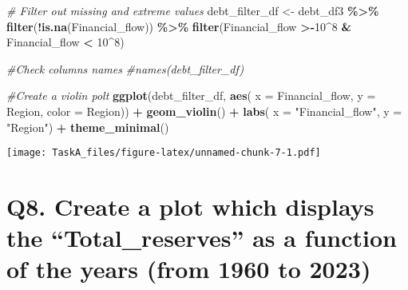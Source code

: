 \documentclass[
]{article}
\newenvironment{Shaded}{\begin{snugshade}}{\end{snugshade}}
\newcommand{\AttributeTok}[1]{\textcolor[rgb]{0.13,0.29,0.53}{#1}}
\newcommand{\CommentTok}[1]{\textcolor[rgb]{0.56,0.35,0.01}{\textit{#1}}}
\newcommand{\DecValTok}[1]{\textcolor[rgb]{0.00,0.00,0.81}{#1}}
\newcommand{\FunctionTok}[1]{\textcolor[rgb]{0.13,0.29,0.53}{\textbf{#1}}}
\newcommand{\NormalTok}[1]{#1}
\newcommand{\OtherTok}[1]{\textcolor[rgb]{0.56,0.35,0.01}{#1}}
\newcommand{\SpecialCharTok}[1]{\textcolor[rgb]{0.81,0.36,0.00}{\textbf{#1}}}
\newcommand{\StringTok}[1]{\textcolor[rgb]{0.31,0.60,0.02}{#1}}
\begin{document}
\begin{Shaded}
\begin{Highlighting}[]
\CommentTok{\# Filter out missing and extreme values}
\NormalTok{debt\_filter\_df }\OtherTok{\textless{}{-}}\NormalTok{ debt\_df3 }\SpecialCharTok{\%\textgreater{}\%}
  \FunctionTok{filter}\NormalTok{(}\SpecialCharTok{!}\FunctionTok{is.na}\NormalTok{(Financial\_flow)) }\SpecialCharTok{\%\textgreater{}\%}
  \FunctionTok{filter}\NormalTok{(Financial\_flow }\SpecialCharTok{\textgreater{}{-}}\DecValTok{10}\SpecialCharTok{\^{}}\DecValTok{8} \SpecialCharTok{\&}\NormalTok{ Financial\_flow }\SpecialCharTok{\textless{}} \DecValTok{10}\SpecialCharTok{\^{}}\DecValTok{8}\NormalTok{)}

\CommentTok{\#Check columns\textquotesingle{} names}
\CommentTok{\#names(debt\_filter\_df)}

\CommentTok{\#Create a violin polt}
\FunctionTok{ggplot}\NormalTok{(debt\_filter\_df, }\FunctionTok{aes}\NormalTok{( }\AttributeTok{x =}\NormalTok{ Financial\_flow, }\AttributeTok{y =}\NormalTok{ Region, }\AttributeTok{color =}\NormalTok{ Region)) }\SpecialCharTok{+}
  \FunctionTok{geom\_violin}\NormalTok{() }\SpecialCharTok{+}
  \FunctionTok{labs}\NormalTok{( }\AttributeTok{x =} \StringTok{"Financial\_flow"}\NormalTok{, }\AttributeTok{y =} \StringTok{"Region"}\NormalTok{) }\SpecialCharTok{+}
  \FunctionTok{theme\_minimal}\NormalTok{() }
\end{Highlighting}
\end{Shaded}

\texttt{[image: TaskA\_files/figure-latex/unnamed-chunk-7-1.pdf]}

\section{Q8. Create a plot which displays the ``Total\_reserves'' as a
function of the years (from 1960 to
2023)}\label{q8.-create-a-plot-which-displays-the-total_reserves-as-a-function-of-the-years-from-1960-to-2023}
\end{document}
